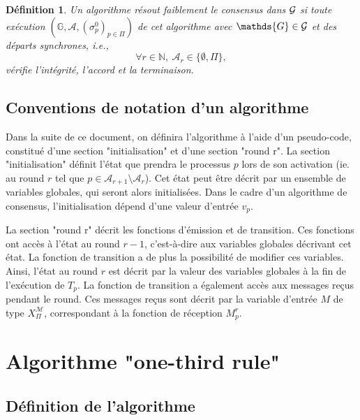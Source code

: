 \documentclass{article}
\newtheorem{definition}{Définition}
\begin{document}
\begin{definition}
	Un algorithme \emph{résout faiblement le consensus dans ${\cal G}$} si toute exécution 
	$( \mathds{G} ,  \mathcal{A} , (\sigma^0_p)_{p \in \Pi})$     de cet algorithme  avec
	$ \mathds{G} \in {\cal G}$  et des d\'eparts synchrones, i.e., 
	$$ \forall r \in \mathds{N}, \  \mathcal{A}_r \in \{\emptyset, \Pi\}  ,$$ 
	vérifie l'intégrité, l'accord et la terminaison.
\end{definition}

\subsection{Conventions de notation d'un algorithme}

Dans la suite de ce document, on définira l'algorithme à l'aide d'un pseudo-code, constitué d'une section "initialisation" et d'une section "round r".
La section "initialisation" définit l'état que prendra le processus $p$ lors de son activation
(ie. au round $r$ tel que $p \in \mathcal{A}_{r+1} \setminus \mathcal{A}_r$).
Cet état peut être décrit par un ensemble de variables globales, qui seront alors initialisées.
Dans le cadre d'un algorithme de consensus, l'initialisation dépend d'une valeur d'entrée $v_p$.

La section "round r" décrit les fonctions d'émission et de transition. Ces fonctions ont accès à l'état au round $r-1$, c'est-à-dire aux
variables globales décrivant cet état.
La fonction de transition a de plus la possibilité de modifier ces variables. Ainsi, l'état au round $r$ est décrit par la valeur des variables globales
à la fin de l'exécution de $T_p$.
La fonction de transition a également accès aux messages reçus pendant le round. Ces messages reçus sont décrit par la variable d'entrée
$M$ de type $X_\Pi^\mathcal{M}$, correspondant à la fonction de réception $M^r_p$.

\section{Algorithme "one-third rule"}
\subsection{Définition de l'algorithme}
\end{document}
